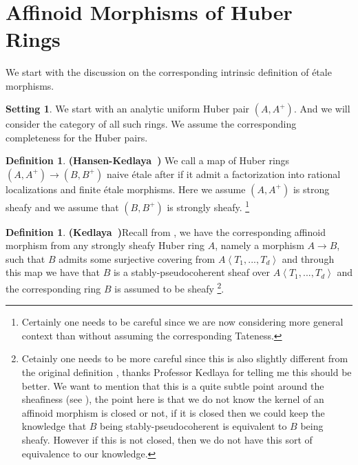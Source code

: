 \documentclass[12pt]{amsart}
\theoremstyle{definition}
\newtheorem{definition}[theorem]{Definition}
\numberwithin{equation}{section}
\newtheorem{setting}[theorem]{Setting}
\begin{document}
\

\section{Affinoid Morphisms of Huber Rings}

\noindent We start with the discussion on the corresponding intrinsic definition of \'etale morphisms.

\begin{setting}
We start with an analytic uniform Huber pair $(A,A^+)$. And we will consider the category of all such rings. We assume the corresponding completeness for the Huber pairs.
\end{setting}


\begin{definition}\mbox{\bf{(Hansen-Kedlaya \cite[Definition 5.1]{HK})}}
We call a map of Huber rings $(A,A^+)\rightarrow (B,B^+)$ naive \'etale after \cite[Definition 5.1]{HK} if it admit a factorization into rational localizations and finite \'etale morphisms. Here we assume $(A,A^+)$ is strong sheafy and we assume that $(B,B^+)$ is strongly sheafy. \footnote{Certainly one needs to be careful since we are now considering more general context than \cite{HK} without assuming the corresponding Tateness.}	
\end{definition}


\begin{definition}\mbox{\bf{(Kedlaya \cite[Definition A5.2]{Ked1})}}\label{definition2.3}
Recall from \cite[Definition A5.2]{Ked1}, we have the corresponding affinoid morphism from any strongly sheafy Huber ring $A$, namely a morphism $A\rightarrow B$, such that $B$ admits some surjective covering from $A\left<T_1,...,T_d\right>$ and through this map we have that $B$ is a stably-pseudocoherent sheaf over $A\left<T_1,...,T_d\right>$ and the corresponding ring $B$ is assumed to be sheafy \footnote{Cetainly one needs to be more careful since this is also slightly different from the original definition \cite[Definition A5.2]{Ked1}, thanks Professor Kedlaya for telling me this should be better. We want to mention that this is a quite subtle point around the sheafiness (see \cite[Theorem 1.4.20]{Ked1}), the point here is that we do not know the kernel of an affinoid morphism is closed or not, if it is closed then we could keep the knowledge that $B$ being stably-pseudocoherent is equivalent to $B$ being sheafy. However if this is not closed, then we do not have this sort of equivalence to our knowledge.}.

	
\end{definition}
\end{document}
